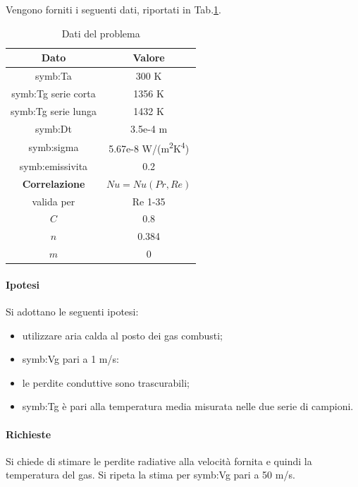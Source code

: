 Vengono forniti i seguenti dati, riportati in Tab.\ref{tab:datiirr}.
\begin{table}[H]
	\centering
	\begin{tabular}{c|c}
		\toprule
		\toprule
		\textbf{Dato} & \textbf{Valore}\\
		\midrule
		\midrule
		\gls{symb:Ta} & 300 K\\
		\midrule
		\gls{symb:Tg} serie corta & 1356 K \\
		\midrule
		\gls{symb:Tg} serie lunga & 1432 K \\
		\midrule
		\gls{symb:Dt} & 3.5e-4 m \\
		\midrule
		\gls{symb:sigma} & 5.67e-8 W/(m\textsuperscript{2}K\textsuperscript{4})\\
		\midrule
		\gls{symb:emissivita} & 0.2 \\
		\midrule
		\midrule
		\textbf{Correlazione} & $ Nu = Nu(Pr,Re) $\\
		valida per & Re 1-35 \\
		\midrule
		$C$ & 0.8 \\
		$n$ & 0.384 \\
		$m$ & 0 \\
		\bottomrule
		\bottomrule
	\end{tabular}
\caption{Dati del problema}
\label{tab:datiirr}
\end{table}

\paragraph{Ipotesi}
Si adottano le seguenti ipotesi:
\begin{itemize}
	\item utilizzare aria calda al posto dei gas combusti;
	\item \gls{symb:Vg} pari a 1 m/s:
	\item le perdite conduttive sono trascurabili;
	\item \gls{symb:Tg} è pari alla temperatura media misurata nelle due serie di campioni.
\end{itemize}

\paragraph{Richieste}
Si chiede di stimare le perdite radiative alla velocità fornita e quindi la temperatura del gas. Si ripeta la stima per \gls{symb:Vg} pari a 50 m/s. 

